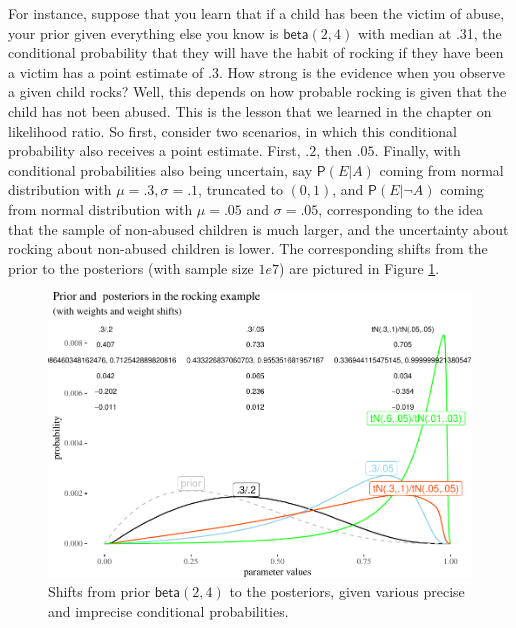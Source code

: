 \documentclass[
  10pt,
  dvipsnames,enabledeprecatedfontcommands]{scrartcl}
\newcommand{\n}{\neg}
\newcommand{\pr}[1]{\mathsf{P}(#1)}
\begin{document}
For instance, suppose that you learn that if a child has been the victim
of abuse, your prior given everything else you know is
\(\mathsf{beta}(2,4)\) with median at .31, the conditional probability
that they will have the habit of rocking if they have been a victim has
a point estimate of .3. How strong is the evidence when you observe a
given child rocks? Well, this depends on how probable rocking is given
that the child has not been abused. This is the lesson that we learned
in the chapter on likelihood ratio. So first, consider two scenarios, in
which this conditional probability also receives a point estimate.
First, \(.2\), then \(.05\). Finally, with conditional probabilities
also being uncertain, say \(\pr{E \vert A}\) coming from normal
distribution with \(\mu = .3, \sigma = .1\), truncated to \((0,1)\), and
\(\pr{E\vert \n A}\) coming from normal distribution with \(\mu = .05\)
and \(\sigma = .05\), corresponding to the idea that the sample of
non-abused children is much larger, and the uncertainty about rocking
about non-abused children is lower. The corresponding shifts from the
prior to the posteriors (with sample size \(1e7\)) are pictured in
Figure \ref{fig:abuse1}.

\begin{figure}[H]

\begin{center}\includegraphics[width=1\linewidth]{imprecision_weight_files/figure-latex/fig:abuse4-1} \end{center}
\caption{Shifts from prior $\mathsf{beta}(2,4)$ to the posteriors, given various precise and imprecise conditional probabilities.}
\label{fig:abuse1}
\end{figure}
\end{document}
